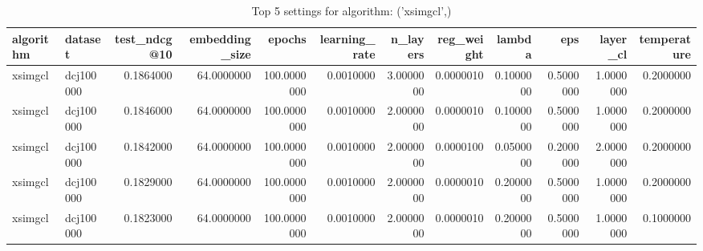 \begin{table}
\caption{Top 5 settings for algorithm: ('xsimgcl',)}
\label{tab:('xsimgcl',)_top5}
\begin{tabular}{llrrrrrrrrrr}
\toprule
algorithm & dataset & test_ndcg@10 & embedding_size & epochs & learning_rate & n_layers & reg_weight & lambda & eps & layer_cl & temperature \\
\midrule
xsimgcl & dcj100000 & 0.1864000 & 64.0000000 & 100.0000000 & 0.0010000 & 3.0000000 & 0.0000010 & 0.1000000 & 0.5000000 & 1.0000000 & 0.2000000 \\
xsimgcl & dcj100000 & 0.1846000 & 64.0000000 & 100.0000000 & 0.0010000 & 2.0000000 & 0.0000010 & 0.1000000 & 0.5000000 & 1.0000000 & 0.2000000 \\
xsimgcl & dcj100000 & 0.1842000 & 64.0000000 & 100.0000000 & 0.0010000 & 2.0000000 & 0.0000100 & 0.0500000 & 0.2000000 & 2.0000000 & 0.2000000 \\
xsimgcl & dcj100000 & 0.1829000 & 64.0000000 & 100.0000000 & 0.0010000 & 2.0000000 & 0.0000010 & 0.2000000 & 0.5000000 & 1.0000000 & 0.2000000 \\
xsimgcl & dcj100000 & 0.1823000 & 64.0000000 & 100.0000000 & 0.0010000 & 2.0000000 & 0.0000010 & 0.2000000 & 0.5000000 & 1.0000000 & 0.1000000 \\
\bottomrule
\end{tabular}
\end{table}



